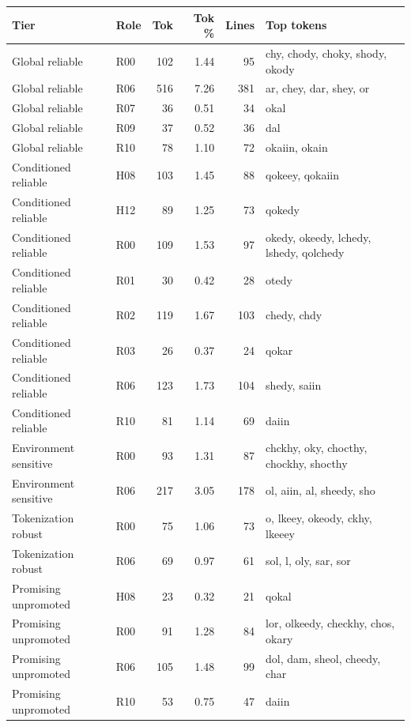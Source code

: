 \begin{tabular}{llrrrl}
\toprule
Tier & Role & Tok & Tok \% & Lines & Top tokens \\
\midrule
Global reliable & R00 & 102 & 1.44 & 95 & chy, chody, choky, shody, okody \\
Global reliable & R06 & 516 & 7.26 & 381 & ar, chey, dar, shey, or \\
Global reliable & R07 & 36 & 0.51 & 34 & okal \\
Global reliable & R09 & 37 & 0.52 & 36 & dal \\
Global reliable & R10 & 78 & 1.10 & 72 & okaiin, okain \\
Conditioned reliable & H08 & 103 & 1.45 & 88 & qokeey, qokaiin \\
Conditioned reliable & H12 & 89 & 1.25 & 73 & qokedy \\
Conditioned reliable & R00 & 109 & 1.53 & 97 & okedy, okeedy, lchedy, lshedy, qolchedy \\
Conditioned reliable & R01 & 30 & 0.42 & 28 & otedy \\
Conditioned reliable & R02 & 119 & 1.67 & 103 & chedy, chdy \\
Conditioned reliable & R03 & 26 & 0.37 & 24 & qokar \\
Conditioned reliable & R06 & 123 & 1.73 & 104 & shedy, saiin \\
Conditioned reliable & R10 & 81 & 1.14 & 69 & daiin \\
Environment sensitive & R00 & 93 & 1.31 & 87 & chckhy, oky, chocthy, chockhy, shocthy \\
Environment sensitive & R06 & 217 & 3.05 & 178 & ol, aiin, al, sheedy, sho \\
Tokenization robust & R00 & 75 & 1.06 & 73 & o, lkeey, okeody, ckhy, lkeeey \\
Tokenization robust & R06 & 69 & 0.97 & 61 & sol, l, oly, sar, sor \\
Promising unpromoted & H08 & 23 & 0.32 & 21 & qokal \\
Promising unpromoted & R00 & 91 & 1.28 & 84 & lor, olkeedy, checkhy, chos, okary \\
Promising unpromoted & R06 & 105 & 1.48 & 99 & dol, dam, sheol, cheedy, char \\
Promising unpromoted & R10 & 53 & 0.75 & 47 & daiin \\
\bottomrule
\end{tabular}